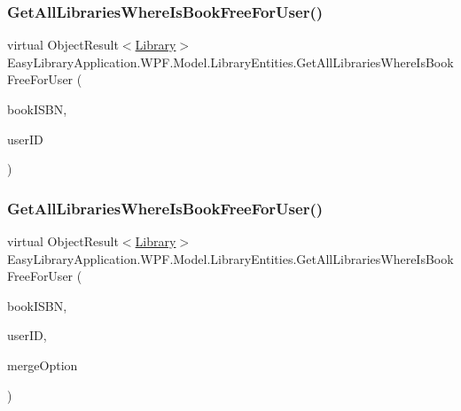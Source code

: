 \subsubsection{\texorpdfstring{Get\+All\+Libraries\+Where\+Is\+Book\+Free\+For\+User()}{GetAllLibrariesWhereIsBookFreeForUser()}\hspace{0.1cm}{\footnotesize\ttfamily [1/2]}}
{\footnotesize\ttfamily virtual Object\+Result$<$\mbox{\hyperlink{class_easy_library_application_1_1_w_p_f_1_1_model_1_1_library}{Library}}$>$ Easy\+Library\+Application.\+W\+P\+F.\+Model.\+Library\+Entities.\+Get\+All\+Libraries\+Where\+Is\+Book\+Free\+For\+User (\begin{DoxyParamCaption}\item[{string}]{book\+I\+S\+BN,  }\item[{Nullable$<$ int $>$}]{user\+ID }\end{DoxyParamCaption})\hspace{0.3cm}{\ttfamily [virtual]}}

\mbox{\label{class_easy_library_application_1_1_w_p_f_1_1_model_1_1_library_entities_acbdab1601ec88b793113cfe81f7c1584}} 
\subsubsection{\texorpdfstring{Get\+All\+Libraries\+Where\+Is\+Book\+Free\+For\+User()}{GetAllLibrariesWhereIsBookFreeForUser()}\hspace{0.1cm}{\footnotesize\ttfamily [2/2]}}
{\footnotesize\ttfamily virtual Object\+Result$<$\mbox{\hyperlink{class_easy_library_application_1_1_w_p_f_1_1_model_1_1_library}{Library}}$>$ Easy\+Library\+Application.\+W\+P\+F.\+Model.\+Library\+Entities.\+Get\+All\+Libraries\+Where\+Is\+Book\+Free\+For\+User (\begin{DoxyParamCaption}\item[{string}]{book\+I\+S\+BN,  }\item[{Nullable$<$ int $>$}]{user\+ID,  }\item[{Merge\+Option}]{merge\+Option }\end{DoxyParamCaption})\hspace{0.3cm}{\ttfamily [virtual]}}

